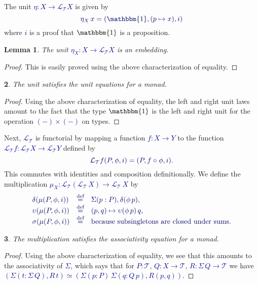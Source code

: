 \documentclass[10pt]{article}
\newcommand{\db}{\textcolor{darkblue}}
\newcommand{\m}[1]{\db{$#1$}}
\newcommand{\M}[1]{\[\db{#1}\]}
\newcommand{\comp}{\mathrel{\circ}}
\newcommand{\U}{\mathcal{U}}
\newcommand{\V}{\mathcal{V}}
\newcommand{\T}{\mathcal{T}}
\newcommand{\Lift}{\mathcal{L}}
\newcommand{\One}{\mathbbm{1}}
\newcommand{\eqdef}{\overset{\text{def}}{=}}
\newtheorem{numbered}{}
\newtheorem{lemma}[numbered]{Lemma}
\theoremstyle{definition}
\begin{document}
The unit \m{\eta : X
  \to \Lift_\T X} is given by \M{\eta_X \, x = (\One, (p \mapsto x), i)}
where \m{i} is a proof that \m{\One} is a proposition.
\begin{lemma}
  The unit \m{\eta_X : X\to\Lift_\T X} is an embedding.
\end{lemma}
\begin{proof}
  This is easily proved using the above characterization of equality.
\end{proof}
\begin{numbered}
  The unit satisfies the unit equations for a monad.
\end{numbered}
\begin{proof}
  Using the above characterization of equality, the left and right
  unit laws amount to the fact that the type \m{\One} is the left
  and right unit for the operation \m{(-)\times(-)} on types.
\end{proof}
\noindent Next, \m{\Lift_\T} is functorial by mapping a function
\m{f : X \to Y} to the function \m{\Lift_\T f : \Lift_\T X \to \Lift_\T Y}
defined by
%
\M{
\Lift_\T f (P , \phi , i) = (P , f \comp \phi , i).
}
%
This commutes with identities and composition definitionally.
%
%
We define the multiplication \m{\mu_X : \Lift_{\T} (\Lift_{\T}\, X) \to \Lift_{\T}\, X} by
%
\M{
  \begin{array}{lll}
  \delta (\mu (P , \phi , i)) & \eqdef & \Sigma (p : P), \delta (\phi \, p), \\
  \upsilon (\mu (P , \phi , i)) & \eqdef & (p , q) \mapsto \upsilon (\phi \, p) \, q , \\
  \sigma (\mu (P , \phi , i)) & \eqdef & \text{because subsingletons are closed under sums.} \\
  \end{array}
}
%
\begin{numbered}
  The multiplication satisfies the associativity equation for a monad.
\end{numbered}
\begin{proof}
  Using the above characterization of equality, we see that this
  amounts to the associativity of \m{\Sigma}, which says that for
  \m{P:\T}, \m{Q: X \to \T}, \m{R : \Sigma \, Q \to \T} we have
   \m{(\Sigma (t : \Sigma \, Q), R \, t) \simeq (\Sigma (p : P)\,
    \Sigma (q : Q \, p), R(p,q))}.
\end{proof}
\end{document}
